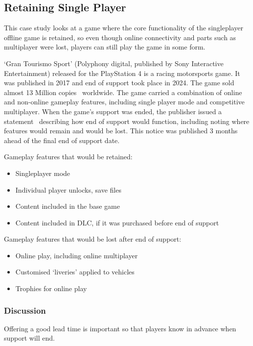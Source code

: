 \subsection{Retaining Single Player}
This case study looks at a game where the core functionality of the singleplayer offline game is retained,
so even though online connectivity and parts such as multiplayer were lost,
players can still play the game in some form.

`Gran Tourismo Sport' (Polyphony digital, published by Sony Interactive Entertainment) released for the PlayStation 4 is a racing motorsports game.
It was published in 2017 and end of support took place in 2024.
The game sold almost 13 Million copies~\cite{gtsport-sales-2023} worldwide.
The game carried a combination of online and non-online gameplay features, including single player mode and competitive multiplayer.
When the game's support was ended, the publisher issued a statement~\cite{gtsport-eos-2023} describing how end of support would function,
including noting where features would remain and would be lost.
This notice was published 3 months ahead of the final end of support date.

Gameplay features that would be retained:
\begin{itemize}
    \item Singleplayer mode
    \item Individual player \glspl{unlock}, \gls{save} files
    \item Content included in the base game
    \item Content included in DLC, if it was purchased before end of support
\end{itemize}

Gameplay features that would be lost after end of support:
\begin{itemize}
    \item Online play, including online multiplayer
    \item Customised `liveries' applied to vehicles
    \item Trophies for online play
\end{itemize}

\subsubsection*{Discussion}
Offering a good lead time is important so that players know in advance when support will end.

